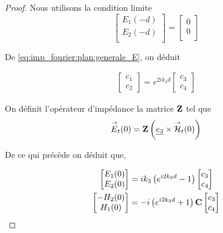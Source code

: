 \begin{proof}
    Nous utilisons la condition limite 
    \begin{equation}
        \begin{bmatrix}
            E_1(-d)\\
            E_2(-d)\\
        \end{bmatrix}
        =
        \begin{bmatrix}
            0\\
            0\\
        \end{bmatrix}
    \end{equation}

    De \eqref{eq:imp_fourier:plan:generale_E}, on déduit

    \begin{align}
        \begin{bmatrix}
            c_1 \\
            c_2
        \end{bmatrix}
        = e^{2ik_3 d}
        \begin{bmatrix}
            c_3 \\
            c_4
        \end{bmatrix}
    \end{align}

    On définit l'opérateur d'impédance la matrice $\mathbf{Z}$ tel que 
    \begin{equation}
        {\overset{\rightarrow}{E}}_t(0) = \mathbf{Z} \left(\underline{e_3} \times {\overset{\rightarrow}{\mathcal{H}}}_t(0)\right)
    \end{equation}

    De ce qui précède on déduit que,

    \begin{align}
        \begin{bmatrix}
            E_1(0)\\
            E_2(0)\\
        \end{bmatrix}
        &=ik_3\left( e^{i2k_3 d} -1 \right)
        \begin{bmatrix}
            c_3 \\
            c_4
        \end{bmatrix} \\
        \begin{bmatrix}
            -H_2(0)\\
            H_1(0)\\
        \end{bmatrix}
        & = - i\left(e^{i2k_3 d} +1 \right)
        \mathbf{C}
        \begin{bmatrix}
        c_3 \\
        c_4
        \end{bmatrix}
    \end{align}


\end{proof}
